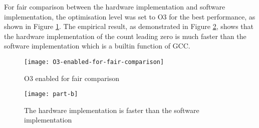 For fair comparison between the hardware implementation and software implementation, the optimisation level was set to O3 for the best performance, as shown in Figure \ref{fig:O3-enabled-for-fair-comparison}. The empirical result, as demonstrated in Figure \ref{fig:part-b}, shows that the hardware implementation of the count leading zero is much faster than the software implementation which is a builtin function of GCC.

\begin{figure}[htbp]
   \centering
   \texttt{[image: O3-enabled-for-fair-comparison]}
   \caption{O3 enabled for fair comparison}
   \label{fig:O3-enabled-for-fair-comparison}
\end{figure}

\begin{figure}[htbp]
   \centering
   \texttt{[image: part-b]}
   \caption{The hardware implementation is faster than the software implementation}
   \label{fig:part-b}
\end{figure}
